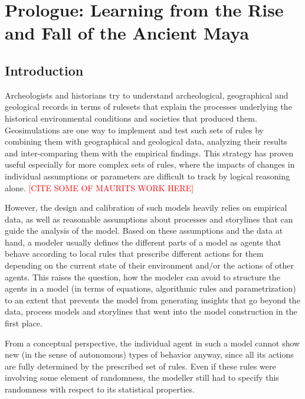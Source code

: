 \chapter{Prologue: Learning from the Rise and Fall of the Ancient Maya}

\section{Introduction}

Archeologists and historians try to understand archeological, geographical and geological records in terms of rulesets that explain the processes underlying the historical environmental conditions and societies that produced them.
Geosimulations are one way to implement and test such sets of rules by combining them with geographical and geological data, analyzing their results and inter-comparing them with the empirical findings. This strategy has proven useful especially for more complex sets of rules, where the impacts of changes in individual assumptions or parameters are difficult to track by logical reasoning alone. \textcolor{red}{[CITE SOME OF MAURITS WORK HERE]}

However, the design and calibration of such models heavily relies on empirical data, as well as reasonable assumptions about processes and storylines that can guide the analysis of the model. Based on these assumptions and the data at hand, a modeler usually defines the different parts of a model as agents that behave according to local rules that prescribe different actions for them depending on the current state of their environment and/or the actions of other agents. This raises the question, how the modeler can avoid to structure the agents in a model (in terms of equations, algorithmic rules and parametrization) to an extent that prevents the model from generating insights that go beyond the data, process models and storylines that went into the model construction in the first place.

From a conceptual perspective, the individual agent in such a model cannot show new (in the sense of autonomous) types of behavior anyway, since all its actions are fully determined by the prescribed set of rules. Even if these rules were involving some element of randomness, the modeller still had to specify this randomness with respect to its statistical properties. 


